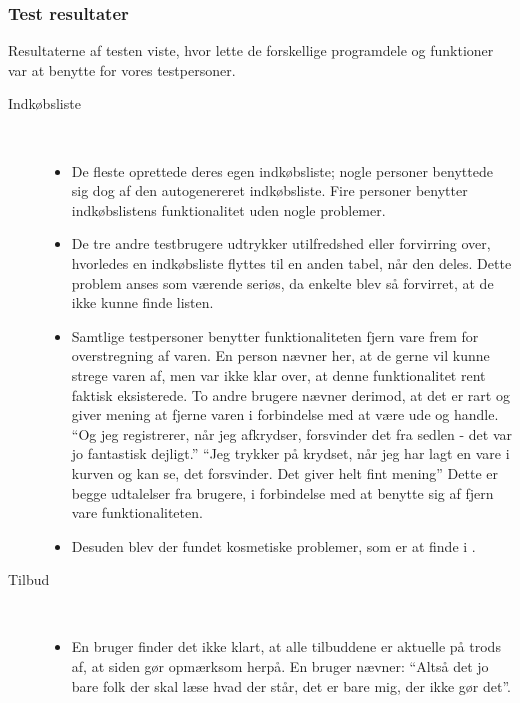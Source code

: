\subsubsection{Test resultater}\label{ss:bt2}
Resultaterne af testen viste, hvor lette de forskellige programdele og funktioner var at benytte for vores testpersoner.
\begin{description}
   \item[Indkøbsliste]\hfill\\
   \vspace{-15pt}
   \begin{itemize}[nolistsep, noitemsep]
      \item De fleste oprettede deres egen indkøbsliste; nogle personer benyttede sig dog af den autogenereret indkøbsliste. 
      Fire personer benytter indkøbslistens funktionalitet uden nogle problemer.
      \item De tre andre testbrugere udtrykker utilfredshed eller forvirring over, hvorledes en indkøbsliste flyttes til en anden tabel, når den deles.
      Dette problem anses som værende seriøs, da enkelte blev så forvirret, at de ikke kunne finde listen. 
      \item Samtlige testpersoner benytter funktionaliteten fjern vare frem for overstregning af varen. 
      En person nævner her, at de gerne vil kunne strege varen af, men var ikke klar over, at denne funktionalitet rent faktisk eksisterede.
      To andre brugere nævner derimod, at det er rart og giver mening at fjerne varen i forbindelse med at være ude og handle.
      ``Og jeg registrerer, når jeg afkrydser, forsvinder det fra sedlen - det var jo fantastisk dejligt.''
      ``Jeg trykker på krydset, når jeg har lagt en vare i kurven og kan se, det forsvinder. Det giver helt fint mening''
      Dette er begge udtalelser fra brugere, i forbindelse med at benytte sig af fjern vare funktionaliteten.
      \item Desuden blev der fundet kosmetiske problemer, som er at finde i .
   \end{itemize}
   \item[Tilbud]\hfill\\
   \vspace{-15pt}
   \begin{itemize}[nolistsep, noitemsep]
      \item En bruger finder det ikke klart, at alle tilbuddene er aktuelle på trods af, at siden gør opmærksom herpå.
      En bruger nævner: ``Altså det jo bare folk der skal læse hvad der står, det er bare mig, der ikke gør det''.

\end{itemize}
\end{description}
